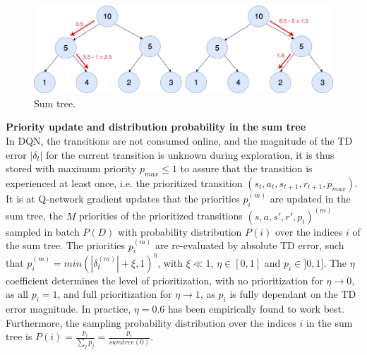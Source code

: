 \begin{figure}
\includegraphics[scale=0.5]{img/I/Simple-SumTree-left-traverse.png}
\centering
\caption{Sum tree.}
\end{figure}

\textbf{Priority update and distribution probability in the sum tree} \\
In DQN, the transitions are not consumed online, and the magnitude of the TD error $|\delta_t|$ for the current transition is unknown during exploration, it is thus stored with maximum priority $p_{max} \leq 1$ to assure that the transition is experienced at least once, i.e. the prioritized transition $(s_t,a_t,s_{t+1},r_{t+1}, p_{max})$. It is at Q-network gradient updates that the priorities $p_i^{(m)}$ are updated in the sum tree, the $M$ priorities of the prioritized transitions $(s,a,s',r',p_i)^{(m)}$ sampled in batch $P(D)$ with probability distribution $P(i)$ over the indices $i$ of the sum tree. The priorities $p_i^{(m)}$ are re-evaluated by absolute TD error, such that $p_i^{(m)}= min(|\delta^{(m)}_t| + \xi, 1)^{\eta}$, with $\xi \ll 1$, $\eta \in [0,1]$ and $p_i \in ]0,1]$. The $\eta$ coefficient determines the level of prioritization, with no prioritization for $\eta \rightarrow 0$, as all $p_i=1$, and full prioritization for $\eta \rightarrow 1$, as $p_i$ is fully dependant on the TD error magnitude. In practice, $\eta=0.6$ has been empirically found to work best. Furthermore, the sampling probability distribution over the indices $i$ in the sum tree is $P(i) = \frac{p_i}{\sum_j p_j} = \frac{p_i}{sum tree (0)}$.

